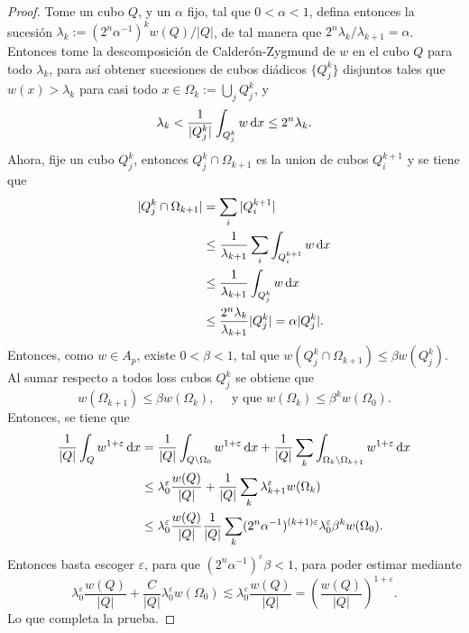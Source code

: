 \begin{proof}
	Tome un cubo $Q$, y un $\alpha$ fijo, tal que $0<\alpha<1$,  defina  entonces la sucesión  $\lambda_k := (2^n\alpha^{-1})^kw(Q)/|Q|$, de tal manera que $2^n\lambda_k/\lambda_{k+1} = \alpha$. Entonces tome la descomposición de Calderón-Zygmund de $w$ en el cubo $Q$ para todo $\lambda_k$, para así obtener sucesiones de cubos diádicos $\{Q_j^k\}$ disjuntos tales que $w(x) >\lambda_k$ para casi todo $x\in \Omega_k := \bigcup_jQ_j^k$, y
	\begin{equation*}
		\lambda_k < \frac{1}{|Q_j^k|}\int_{Q_j^k} w\mathop{}\!\mathrm{d} x \leq 2^n\lambda_k.
	\end{equation*}
	Ahora, fije un cubo $Q_j^k$, entonces $Q_j^k \cap \Omega_{k+1}$ es la union de cubos $Q_i^{k+1}$ y se tiene que 
	\begin{align*}
		|Q_j^k \cap \Omega_{k+1}| & = \sum_i |Q_i^{k+1}| \\
		& \leq \frac{1}{\lambda_{k+1}} \sum_i \int_{Q_i^{k+1}} w\mathop{}\!\mathrm{d} x\\
		& \leq \frac{1}{\lambda_{k+1}}  \int_{Q_j^k} w\mathop{}\!\mathrm{d} x \\ 
		& \leq \frac{2^n\lambda_k}{\lambda_{k+1}}|Q_j^k| = \alpha |Q_j^k|.
	\end{align*}
	Entonces, como $w\in A_p$, existe $0<\beta<1$, tal que $w(Q_j^k \cap \Omega_{k+1}) \leq \beta w(Q_j^k)$. Al sumar respecto a todos loss cubos $Q_j^k$ se obtiene que 
	\begin{equation*}
		w(\Omega_{k+1}) \leq \beta w(\Omega_k), \quad \text{ y que } w(\Omega_k) \leq \beta^k w(\Omega_0).
	\end{equation*}
	Entonces, se tiene que 
	\begin{align*}
		\frac{1}{|Q|}\int_Q w^{1+\varepsilon} \mathop{}\!\mathrm{d} x & = \frac{1}{|Q|}\int_{Q\setminus \Omega_0} w^{1+\varepsilon} \mathop{}\!\mathrm{d} x + \frac{1}{|Q|} \sum_k \int_{\Omega_k\setminus \Omega_{k+1}} w^{1+\varepsilon} \mathop{}\!\mathrm{d} x \\
		& \leq \lambda_0^\varepsilon \frac{w(Q)}{|Q|} + \frac{1}{|Q|}\sum_k \lambda_{k+1}^\varepsilon w(\Omega_k)  \\
		& \leq \lambda_0^\varepsilon \frac{w(Q)}{|Q|}  \frac{1}{|Q|}\sum_k (2^n\alpha^{-1})^{(k+1)\varepsilon}\lambda_0^\varepsilon  \beta^kw(\Omega_0).
	\end{align*}
	Entonces basta escoger $\varepsilon$, para que $(2^n\alpha^{-1})^\varepsilon\beta<1$, para poder estimar mediante 
	\begin{equation*}
		\lambda_0^\varepsilon \frac{w(Q)}{|Q|} + \frac{C}{|Q|} \lambda_0^\varepsilon w(\Omega_0) \lesssim \lambda_0^\varepsilon \frac{w(Q)}{|Q|}  = \left(\frac{w(Q)}{|Q|}\right)^{1+\varepsilon}.
	\end{equation*}
	Lo que completa la prueba.
\end{proof}
